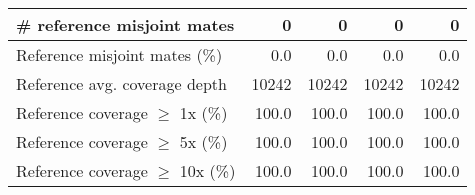 \documentclass[12pt,a4paper]{article}
\begin{document}
\begin{table}[ht]
\begin{center}
\begin{tabular}{|l*{4}{|r}|}
\# reference misjoint mates & 0 & 0 & 0 & 0 \\ \hline
Reference misjoint mates (\%) & 0.0 & 0.0 & 0.0 & 0.0 \\ \hline
Reference avg. coverage depth & 10242 & 10242 & 10242 & 10242 \\ \hline
Reference coverage $\geq$ 1x (\%) & 100.0 & 100.0 & 100.0 & 100.0 \\ \hline
Reference coverage $\geq$ 5x (\%) & 100.0 & 100.0 & 100.0 & 100.0 \\ \hline
Reference coverage $\geq$ 10x (\%) & 100.0 & 100.0 & 100.0 & 100.0 \\ \hline
\end{tabular}
\end{center}
\end{table}
\end{document}
